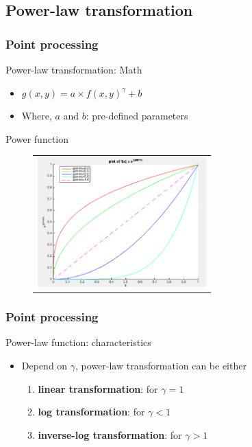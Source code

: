 \documentclass[english,11pt,table,handout]{beamer}
\begin{document}
\subsection{Power-law transformation}
\begin{frame}[fragile]
\frametitle{Point processing}
\begin{block}{Power-law transformation: Math}
	\begin{itemize}
		\item  $g(x,y) = a \times f(x,y)^{\gamma} + b$
		\item Where, $a$  and $b$: pre-defined parameters
	\end{itemize}
\end{block}

\begin{block}{Power function}
	\begin{figure}[!h]
		\begin{table}
			\begin{tabular}{c}
				\includegraphics[height=5cm]{./images/gamma_func.png} 
			\end{tabular}
		\end{table}
	\end{figure}
\end{block}
\end{frame}


\begin{frame}[fragile]
\frametitle{Point processing}
\begin{block}{Power-law function: characteristics}
	\begin{itemize}
		\item Depend on $\gamma$, power-law transformation can be either
		\begin{enumerate}
			\item \textbf{linear transformation}: for $\gamma = 1$
			\item \textbf{log transformation}: for $\gamma < 1$
			\item \textbf{inverse-log transformation}: for $\gamma > 1$
		\end{enumerate}
		
		
	\end{itemize}
\end{block}
\end{frame}
\end{document}
